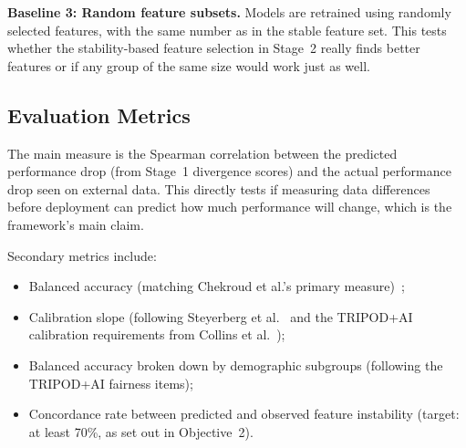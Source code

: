 \textbf{Baseline 3: Random feature subsets.} Models are retrained using randomly selected features, with the same number as in the stable feature set. This tests whether the stability-based feature selection in Stage~2 really finds better features or if any group of the same size would work just as well.

\subsection{Evaluation Metrics}

The main measure is the Spearman correlation between the predicted performance drop (from Stage~1 divergence scores) and the actual performance drop seen on external data. This directly tests if measuring data differences before deployment can predict how much performance will change, which is the framework's main claim.

Secondary metrics include:
\begin{itemize}
    \item Balanced accuracy (matching Chekroud et al.'s primary measure)~\cite{chekroud2024illusory};
    \item Calibration slope (following Steyerberg et al.~\cite{steyerberg2010assessing} and the TRIPOD+AI calibration requirements from Collins et al.~\cite{collins2024tripod});
    \item Balanced accuracy broken down by demographic subgroups (following the TRIPOD+AI fairness items);
    \item Concordance rate between predicted and observed feature instability (target: at least 70\%, as set out in Objective~2).
\end{itemize}